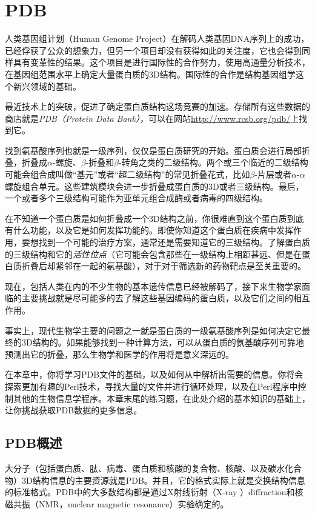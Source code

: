 \chapter{PDB}
\label{chap:chapter11}
\minitoc

人类基因组计划（Human Genome
Project）在解码人类基因DNA序列上的成功，已经俘获了公众的想象力，但另一个项目却没有获得如此的关注度，它也会得到同样具有变革性的结果。这个项目是进行国际性的合作努力，使用高通量分析技术，在基因组范围水平上确定大量蛋白质的3D结构。国际性的合作是结构基因组学这个新兴领域的基础。

最近技术上的突破，促进了确定蛋白质结构这场竞赛的加速。存储所有这些数据的商店就是\textit{PDB（Protein Data Bank）}，可以在网站\href{http://www.rcsb.org/pdb/}{http://www.rcsb.org/pdb/}上找到它。

找到氨基酸序列也就是一级序列，仅仅是蛋白质研究的开始。蛋白质会进行局部折叠，折叠成$\alpha$-螺旋、$\beta$-折叠和$\beta$-转角之类的二级结构。两个或三个临近的二级结构可能会组合成叫做“基元”或者“超二级结构”的常见折叠花式，比如$\beta$-片层或者$\alpha$-$\alpha$螺旋组合单元。这些建筑模块会进一步折叠成蛋白质的3D或者三级结构。最后，一个或者多个三级结构可能作为亚单元组合成酶或者病毒的四级结构。

在不知道一个蛋白质是如何折叠成一个3D结构之前，你很难直到这个蛋白质到底有什么功能，以及它是如何发挥功能的。即使你知道这个蛋白质在疾病中发挥作用，要想找到一个可能的治疗方案，通常还是需要知道它的三级结构。了解蛋白质的三级结构和它的\textit{活性位点}（它可能会包含那些在一级结构上相距甚远、但是在蛋白质折叠后却紧邻在一起的氨基酸），对于对于筛选新的药物靶点是至关重要的。

现在，包括人类在内的不少生物的基本遗传信息已经被解码了，接下来生物学家面临的主要挑战就是尽可能多的去了解这些基因编码的蛋白质，以及它们之间的相互作用。

事实上，现代生物学主要的问题之一就是蛋白质的一级氨基酸序列是如何决定它最终的3D结构的。如果能够找到一种计算方法，可以从蛋白质的氨基酸序列可靠地预测出它的折叠，那么生物学和医学的作用将是意义深远的。

在本章中，你将学习PDB文件的基础，以及如何从中解析出需要的信息。你将会探索更加有趣的Perl技术，寻找大量的文件并进行循环处理，以及在Perl程序中控制其他的生物信息学程序。本章末尾的练习题，在此处介绍的基本知识的基础上，让你挑战获取PDB数据的更多信息。

\section{PDB概述}
大分子（包括蛋白质、肽、病毒、蛋白质和核酸的复合物、核酸、以及碳水化合物）3D结构信息的主要资源就是PDB。并且，它的格式实际上就是交换结构信息的标准格式。PDB中的大多数结构都是通过X射线衍射（X-ray ）diffraction和核磁共振（NMR，nuclear magnetic resonance）实验确定的。

